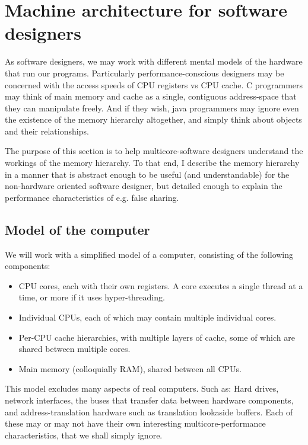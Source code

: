 \chapter{Machine architecture for software designers}
As software designers, we may work with different mental models of the hardware
that run our programs. Particularly performance-conscious designers may be
concerned with the access speeds of CPU registers vs CPU cache. C programmers
may think of main memory and cache as a single, contiguous address-space that
they can manipulate freely. And if they wish, java programmers may ignore even
the existence of the memory hierarchy altogether, and simply think about objects
and their relationships.

The purpose of this section is to help multicore-software designers understand the
workings of the memory hierarchy. To that end, I describe the memory hierarchy
in a manner that is abstract enough to be useful (and understandable) for the
non-hardware oriented software designer, but detailed enough to explain the
performance characteristics of e.g. false sharing.

\section{Model of the computer}
We will work with a simplified model of a computer, consisting of the following
components:

\begin{itemize}
	\item CPU cores, each with their own registers. A core executes a single
		thread at a time, or more if it uses hyper-threading.
	\item Individual CPUs, each of which may contain multiple individual cores.
	\item Per-CPU cache hierarchies, with multiple layers of cache,
		some of which are shared between multiple cores.
	\item Main memory (colloquially RAM), shared between all CPUs.
\end{itemize}


This model excludes many aspects of real computers. Such as: Hard drives,
network interfaces, the buses that transfer data between hardware components,
and address-translation hardware such as translation lookaside buffers. Each of
these may or may not have their own interesting multicore-performance
characteristics, that we shall simply ignore.

